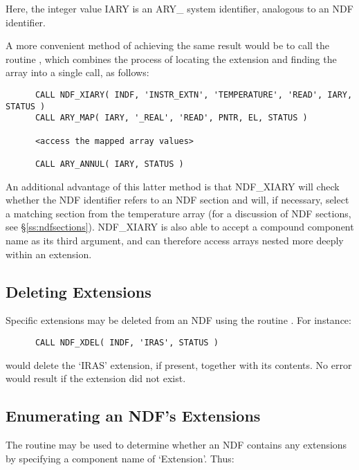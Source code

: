 Here, the integer value IARY is an ARY\_ system identifier, analogous to an NDF
identifier.

A more convenient method of achieving the same result would be to call the
routine , which combines the process of locating the extension and
finding the array into a single call, as follows:

\small
\begin{verbatim}
      CALL NDF_XIARY( INDF, 'INSTR_EXTN', 'TEMPERATURE', 'READ', IARY, STATUS )
      CALL ARY_MAP( IARY, '_REAL', 'READ', PNTR, EL, STATUS )

      <access the mapped array values>

      CALL ARY_ANNUL( IARY, STATUS )
\end{verbatim}
\normalsize

An additional advantage of this latter method is that NDF\_XIARY will
check whether the NDF identifier refers to an NDF section and will, if
necessary, select a matching section from the temperature array (for a
discussion of NDF sections, see \S\ref{ss:ndfsections}). NDF\_XIARY is
also able to accept a compound  component name as
its third argument, and can therefore access arrays nested more deeply
within an extension.

\subsection{Deleting Extensions}

Specific extensions may be deleted from an NDF using the routine .
For instance:

\small
\begin{verbatim}
      CALL NDF_XDEL( INDF, 'IRAS', STATUS )
\end{verbatim}
\normalsize

would delete the `IRAS' extension, if present, together with its contents.
No error would result if the extension did not exist. 

\subsection{Enumerating an NDF's Extensions}

The routine  may be used to determine whether an NDF contains any 
extensions by specifying a component name of `Extension'.
Thus:

